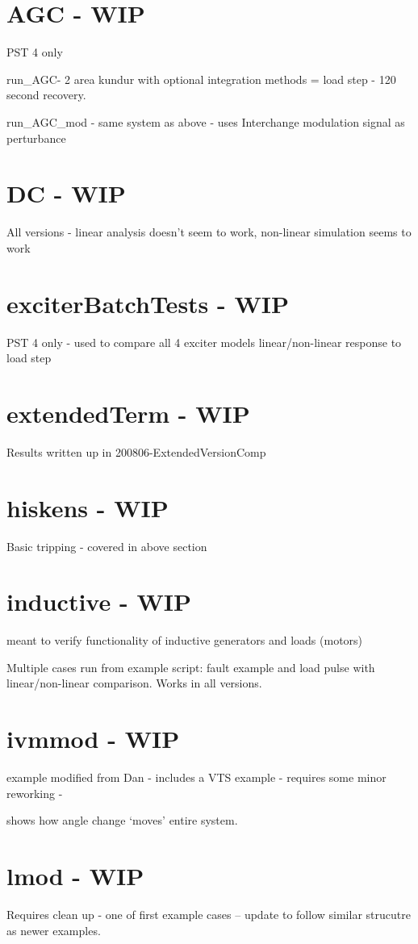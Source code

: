 \section{AGC - WIP}
PST 4 only

run\_AGC- 2 area kundur with optional integration methods = load step - 120 second recovery.

 run\_AGC\_mod - same system as above - uses Interchange modulation signal as perturbance


\section{DC - WIP}
All versions - linear analysis doesn't seem to work, non-linear simulation seems to work

\section{exciterBatchTests - WIP}
PST 4 only - used to compare all 4 exciter models linear/non-linear response to load step

\section{extendedTerm - WIP}
Results written up in 200806-ExtendedVersionComp

\section{hiskens - WIP}
Basic tripping - covered in above section

\section{inductive - WIP}
meant to verify functionality of inductive generators and loads (motors)

Multiple cases run from example script: fault example and load pulse with linear/non-linear comparison.
Works in all versions.

\section{ivmmod - WIP}
example modified from Dan - includes a VTS example  -
requires some minor reworking - 

shows how angle change `moves' entire system.

\section{lmod - WIP}
Requires clean up - one of first example cases -- update to follow similar strucutre as newer examples.

